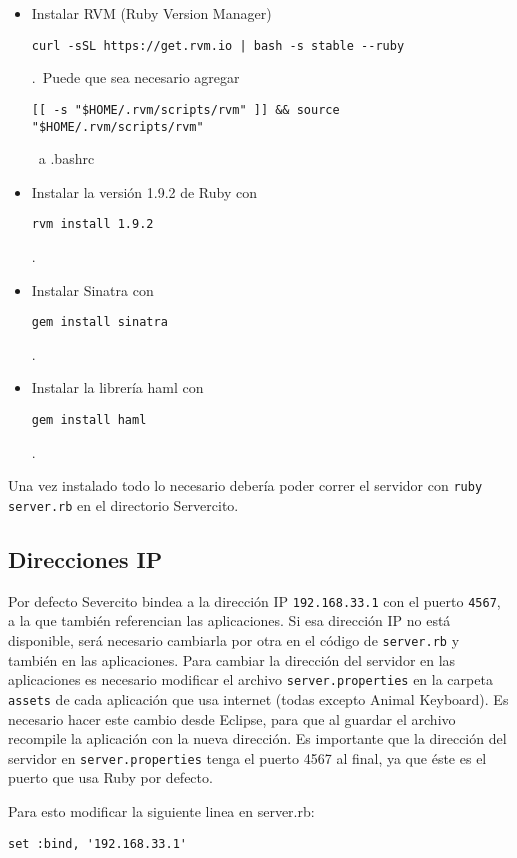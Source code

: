 		\begin{itemize}
			\item Instalar RVM (Ruby Version Manager) 	\begin{verbatim}curl -sSL https://get.rvm.io | bash -s stable --ruby\end{verbatim}.\
			Puede que sea necesario agregar \begin{verbatim}[[ -s "$HOME/.rvm/scripts/rvm" ]] && source "$HOME/.rvm/scripts/rvm"\end{verbatim}\
	a .bashrc
			\item Instalar la versión 1.9.2 de Ruby con \begin{verbatim}rvm install 1.9.2\end{verbatim}.
			\item Instalar Sinatra con \begin{verbatim}gem install sinatra\end{verbatim}.
			\item Instalar la librería haml con \begin{verbatim}gem install haml\end{verbatim}.
		\end{itemize}

		Una vez instalado todo lo necesario debería poder correr el servidor con \texttt{ruby server.rb} en el directorio Servercito.
	
	\subsection{Direcciones IP}
		Por defecto Severcito bindea a la dirección IP \texttt{192.168.33.1} con el puerto \texttt{4567}, a la que también referencian las aplicaciones. Si esa dirección IP no está disponible, será necesario cambiarla por otra en el código de \texttt{server.rb} y también en las aplicaciones. Para cambiar la dirección del servidor en las aplicaciones es necesario modificar el archivo \texttt{server.properties} en la carpeta \texttt{assets} de cada aplicación que usa internet (todas excepto Animal Keyboard). Es necesario hacer este cambio desde Eclipse, para que al guardar el archivo recompile la aplicación con la nueva dirección. Es importante que la dirección del servidor en \texttt{server.properties} tenga el puerto 4567 al 	final, ya que éste es el puerto que usa Ruby por defecto.

Para esto modificar la siguiente linea en server.rb:

\begin{verbatim}
set :bind, '192.168.33.1'
\end{verbatim}

